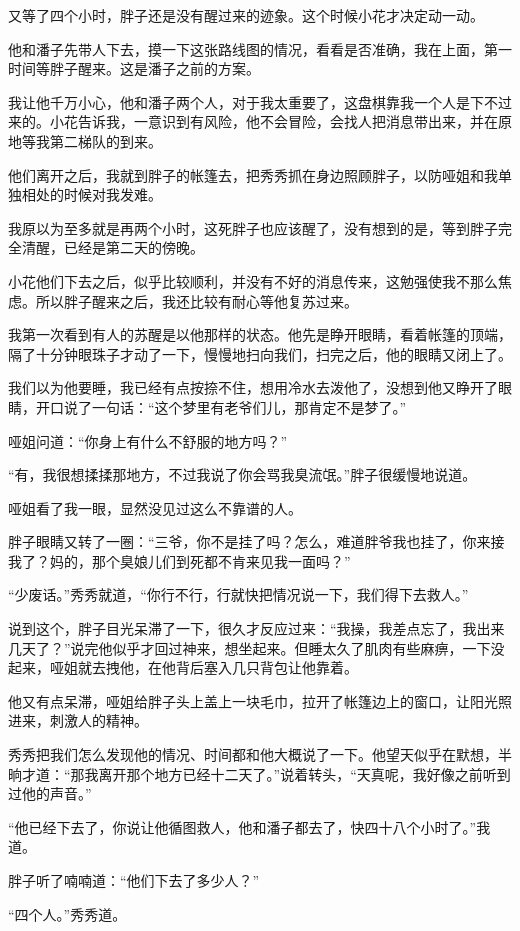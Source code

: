 又等了四个小时，胖子还是没有醒过来的迹象。这个时候小花才决定动一动。

他和潘子先带人下去，摸一下这张路线图的情况，看看是否准确，我在上面，第一时间等胖子醒来。这是潘子之前的方案。

我让他千万小心，他和潘子两个人，对于我太重要了，这盘棋靠我一个人是下不过来的。小花告诉我，一意识到有风险，他不会冒险，会找人把消息带出来，并在原地等我第二梯队的到来。

他们离开之后，我就到胖子的帐篷去，把秀秀抓在身边照顾胖子，以防哑姐和我单独相处的时候对我发难。

我原以为至多就是再两个小时，这死胖子也应该醒了，没有想到的是，等到胖子完全清醒，已经是第二天的傍晚。

小花他们下去之后，似乎比较顺利，并没有不好的消息传来，这勉强使我不那么焦虑。所以胖子醒来之后，我还比较有耐心等他复苏过来。

我第一次看到有人的苏醒是以他那样的状态。他先是睁开眼睛，看着帐篷的顶端，隔了十分钟眼珠子才动了一下，慢慢地扫向我们，扫完之后，他的眼睛又闭上了。

我们以为他要睡，我已经有点按捺不住，想用冷水去泼他了，没想到他又睁开了眼睛，开口说了一句话：“这个梦里有老爷们儿，那肯定不是梦了。”

哑姐问道：“你身上有什么不舒服的地方吗？”

“有，我很想揉揉那地方，不过我说了你会骂我臭流氓。”胖子很缓慢地说道。

哑姐看了我一眼，显然没见过这么不靠谱的人。

胖子眼睛又转了一圈：“三爷，你不是挂了吗？怎么，难道胖爷我也挂了，你来接我了？妈的，那个臭娘儿们到死都不肯来见我一面吗？”

“少废话。”秀秀就道，“你行不行，行就快把情况说一下，我们得下去救人。”

说到这个，胖子目光呆滞了一下，很久才反应过来：“我操，我差点忘了，我出来几天了？”说完他似乎才回过神来，想坐起来。但睡太久了肌肉有些麻痹，一下没起来，哑姐就去拽他，在他背后塞入几只背包让他靠着。

他又有点呆滞，哑姐给胖子头上盖上一块毛巾，拉开了帐篷边上的窗口，让阳光照进来，刺激人的精神。

秀秀把我们怎么发现他的情况、时间都和他大概说了一下。他望天似乎在默想，半晌才道：“那我离开那个地方已经十二天了。”说着转头，“天真呢，我好像之前听到过他的声音。”

“他已经下去了，你说让他循图救人，他和潘子都去了，快四十八个小时了。”我道。

胖子听了喃喃道：“他们下去了多少人？”

“四个人。”秀秀道。

